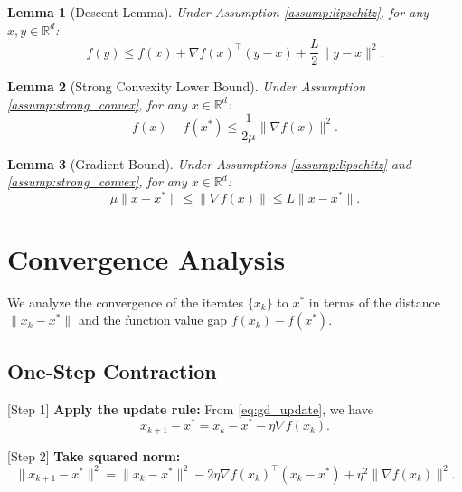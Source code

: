 \documentclass{article}
\newtheorem{lemma}{Lemma}
\begin{document}
\begin{lemma}[Descent Lemma] \label{lemma:descent}
    Under Assumption \ref{assump:lipschitz}, for any $x, y \in \mathbb{R}^d$:
    \begin{equation}
        f(y) \le f(x) + \nabla f(x)^\top (y - x) + \frac{L}{2} \|y - x\|^2.
    \end{equation}
\end{lemma}

\begin{lemma}[Strong Convexity Lower Bound] \label{lemma:strong_convex_lower}
    Under Assumption \ref{assump:strong_convex}, for any $x \in \mathbb{R}^d$:
    \begin{equation}
        f(x) - f(x^*) \le \frac{1}{2\mu} \|\nabla f(x)\|^2.
    \end{equation}
\end{lemma}

\begin{lemma}[Gradient Bound] \label{lemma:gradient_bound}
    Under Assumptions \ref{assump:lipschitz} and \ref{assump:strong_convex}, for any $x \in \mathbb{R}^d$:
    \begin{equation}
        \mu \|x - x^*\| \le \|\nabla f(x)\| \le L \|x - x^*\|.
    \end{equation}
\end{lemma}

\section{Convergence Analysis}

We analyze the convergence of the iterates $\{x_k\}$ to $x^*$ in terms of the distance $\|x_k - x^*\|$ and the function value gap $f(x_k) - f(x^*)$.

\subsection{One-Step Contraction}

[Step 1] \textbf{Apply the update rule:} From \eqref{eq:gd_update}, we have
\begin{equation}
    x_{k+1} - x^* = x_k - x^* - \eta \nabla f(x_k).
\end{equation}

[Step 2] \textbf{Take squared norm:}
\begin{equation}
    \|x_{k+1} - x^*\|^2 = \|x_k - x^*\|^2 - 2\eta \nabla f(x_k)^\top (x_k - x^*) + \eta^2 \|\nabla f(x_k)\|^2.
\end{equation}
\end{document}

